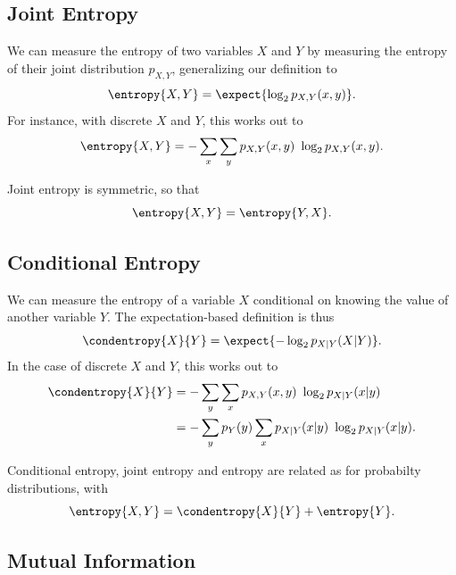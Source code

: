 \subsection{Joint Entropy}\label{section:stats-joint-entropy}

We can measure the entropy of two variables $X$ and $Y$ by measuring
the entropy of their joint distribution $p_{X,Y}$, generalizing our
definition to
%
\begin{equation}
\entropy{X,Y} = \expect{\log_2 p_{X,Y}(x,y)}.
\end{equation}
%
For instance, with discrete $X$ and $Y$, this works out to
%
\begin{equation}
\entropy{X,Y} = - \sum_{x} \sum_{y} p_{X,Y}(x,y) \ \log_2 p_{X,Y}(x,y).
\end{equation}
%

Joint entropy is symmetric, so that
%
\begin{equation}
\entropy{X,Y} = \entropy{Y,X}.
\end{equation}

\subsection{Conditional Entropy}\label{section:stats-conditional-entropy}

We can measure the entropy of a variable $X$ conditional on knowing
the value of another variable $Y$.  The expectation-based definition
is thus 
%
\begin{equation}
\condentropy{X}{Y} = \expect{-\log_2 p_{X|Y}(X|Y)}.
\end{equation}
%
In the case of discrete $X$ and $Y$, this works out to
%
\begin{align}
\condentropy{X}{Y} 
&= - \sum_y \sum_x p_{X,Y}(x,y) \ \log_2 p_{X|Y}(x|y)
\\
&= - \sum_y p_Y(y) \sum_x p_{X|Y}(x|y) \ \log_2 p_{X|Y}(x|y).
\end{align}
%

Conditional entropy, joint entropy and entropy are related as for
probabilty distributions, with
%
\begin{equation}
\entropy{X,Y} = \condentropy{X}{Y} + \entropy{Y}.
\end{equation}


\subsection{Mutual Information}\label{section:stats-mutual-information}

